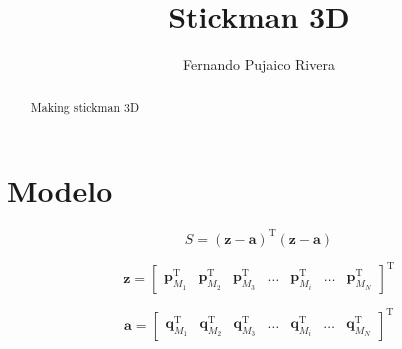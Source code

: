 \documentclass[a4paper,12pt,fleqn]{article}
\title{Stickman 3D}
\author{Fernando Pujaico Rivera}
\newcommand{\transpose}{\mathrm{T}}
\begin{document}
\maketitle

\begin{abstract}
Making stickman 3D
\end{abstract}

\section{Modelo}
 
\begin{equation}
 S=(\mathbf{z}-\mathbf{a})^{\transpose}(\mathbf{z}-\mathbf{a})
\end{equation}

\begin{equation}
 \mathbf{z}=
 \left[
 \begin{matrix}
 \mathbf{p}_{M_1}^{\transpose}&
 \mathbf{p}_{M_2}^{\transpose}&
 \mathbf{p}_{M_3}^{\transpose}&
 \hdots&
 \mathbf{p}_{M_i}^{\transpose}&
 \hdots&
 \mathbf{p}_{M_N }^{\transpose}
 \end{matrix}
 \right]^{\transpose}
\end{equation}

\begin{equation}
 \mathbf{a}=
 \left[
 \begin{matrix}
 \mathbf{q}_{M_1}^{\transpose}&
 \mathbf{q}_{M_2}^{\transpose}&
 \mathbf{q}_{M_3}^{\transpose}&
 \hdots&
 \mathbf{q}_{M_i}^{\transpose}&
 \hdots&
 \mathbf{q}_{M_N}^{\transpose}
 \end{matrix}
 \right]^{\transpose}
\end{equation}
\end{document}
